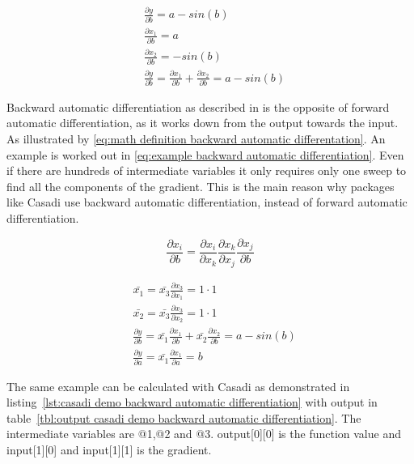 \begin{equation}
	\begin{aligned}
		& \frac{\partial y}{\partial b} = a - sin(b) \\
		& \frac{\partial x_1}{\partial b} = a  \\
		& \frac{\partial x_2}{\partial b} = -sin(b) \\
		& \frac{\partial y}{\partial b} = \frac{\partial x_1}{\partial b} + \frac{\partial x_2}{\partial b}	 = a - sin(b)
	\end{aligned}
	\label{eq:example forward automatic differentiation}
\end{equation}

Backward automatic differentiation as described in\cite{Dhiel} is the opposite of forward automatic differentiation, as it works down from the output towards the input. As illustrated by \eqref{eq:math definition backward automatic differentation}. An example is worked out in \eqref{eq:example backward automatic differentiation}. Even if there are hundreds of intermediate variables it only requires only one sweep to find all the components of the gradient. This is the main reason why packages like Casadi use backward automatic differentiation, instead of forward automatic differentiation.

\begin{equation}
	\frac{\partial x_i}{\partial b} = \frac{\partial x_i}{\partial x_k}\frac{\partial x_k}{\partial x_j}\frac{\partial x_j}{\partial b}
	\label{eq:math definition backward automatic differentation}
\end{equation}

\begin{equation}
\begin{aligned}
& \bar{x_1} = \bar{x_3} \frac{\partial x_3}{\partial x_1} = 1 \cdot 1 \\
& \bar{x_2} = \bar{x_3} \frac{\partial x_3}{\partial x_2} = 1 \cdot 1 \\
& \frac{\partial y}{\partial b} = \bar{x_1} \frac{\partial x_1}{\partial b} + \bar{x_2} \frac{\partial x_2}{\partial b} = a - sin(b)\\
& \frac{\partial y}{\partial a} = \bar{x_1} \frac{\partial x_1}{\partial a} = b
\end{aligned}
\label{eq:example backward automatic differentiation}
\end{equation}

The same example can be calculated with Casadi as demonstrated in listing~\ref{lst:casadi demo backward automatic differentiation} with output in table~\ref{tbl:output casadi demo backward automatic differentiation}. The intermediate variables are @1,@2 and @3. output[0][0] is the function value and input[1][0] and input[1][1] is the gradient. 

